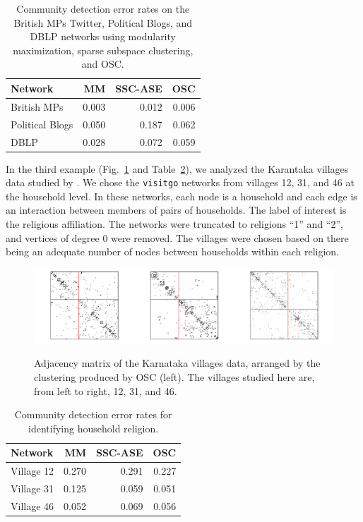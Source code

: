 \documentclass[12pt]{article}
\begin{document}
\begin{table}
\centering
\begin{tabular}[t]{l|r|r|r}
\hline
Network & MM & SSC-ASE & OSC\\
\hline
British MPs & 0.003 & 0.012 & 0.006\\
\hline
Political Blogs & 0.050 & 0.187 & 0.062\\
\hline
DBLP & 0.028 & 0.072 & 0.059\\
\hline
\end{tabular}
\caption{\label{tab:unnamed-chunk-6}Community detection error rates on the British MPs Twitter, Political Blogs, and DBLP networks using modularity maximization, sparse subspace clustering, and OSC.}
\end{table}

In the third example (Fig.~\ref{fig:households-figure} and 
Table~\ref{tab:households-table}), 
we analyzed the Karantaka villages data studied by
\citet{DVN/U3BIHX_2013}. We chose the \texttt{visitgo}
networks from villages 12, 31, and 46 at the household level. 
In these networks, each node is a household and each edge is 
an interaction between members of pairs of households. 
The label of interest is the religious affiliation. 
The networks were truncated to religions ``1'' and ``2'', 
and vertices of degree 0 were removed. 
The villages were chosen based on there being an adequate number of nodes 
between households within each religion. 

\begin{figure}[tp]
{\centering \includegraphics{summary_files/figure-latex/unnamed-chunk-7-1}
}
\caption{Adjacency matrix of the Karnataka villages data, arranged by the clustering produced by OSC (left). The villages studied here are, from left to right, 12, 31, and 46.}\label{fig:households-figure}
\end{figure}

\begin{table}
\centering
\begin{tabular}[t]{l|r|r|r}
\hline
Network & MM & SSC-ASE & OSC\\
\hline
Village 12 & 0.270 & 0.291 & 0.227\\
\hline
Village 31 & 0.125 & 0.059 & 0.051\\
\hline
Village 46 & 0.052 & 0.069 & 0.056\\
\hline
\end{tabular}
\caption{\label{tab:households-table}Community detection error rates for identifying household religion.}
\end{table}
\end{document}
